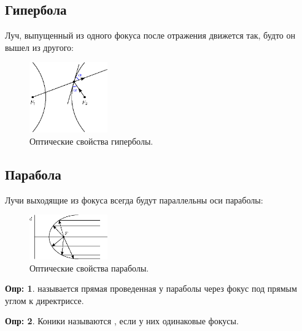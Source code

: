 \documentclass[12pt]{article}
\theoremstyle{definition}
\newtheorem{defn}{Опр:}
\begin{document}
\subsection*{Гипербола}

Луч, выпущенный из одного фокуса после отражения движется так, будто он вышел из другого:
\begin{figure}[H]
	\centering
	\includegraphics[width=0.3\textwidth]{ANGL1_18.eps}
	\caption{Оптические свойства гиперболы.}
	\label{1_18}
\end{figure}

\subsection*{Парабола}
Лучи выходящие из фокуса всегда будут параллельны оси параболы:
\begin{figure}[H]
	\centering
	\includegraphics[width=0.3\textwidth]{ANGL1_19.eps}
	\caption{Оптические свойства параболы.}
	\label{1_19}
\end{figure}
\begin{defn}
	 называется прямая проведенная у параболы через фокус под прямым углом к директриссе.
\end{defn}

\begin{defn}
	Коники называются , если у них одинаковые фокусы.
\end{defn}
\end{document}
